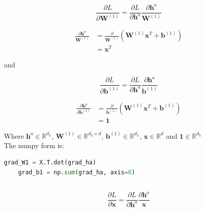 \documentclass[reqno]{amsart}
\theoremstyle{definition}
\theoremstyle{remark}
\numberwithin{equation}{section}
\begin{document}
\subsection{}

\begin{equation}
    \frac{\partial L}{\partial \mathbf{W}^{(1)}} = \frac{\partial L}{\partial \mathbf{h}^a}\frac{\partial \mathbf{h}^a}{ \mathbf{W}^{(1)}}
\end{equation}

\begin{align}
    \frac{\partial \mathbf{h}^a}{ \mathbf{W}^{(1)}} &= \frac{\partial}{\mathbf{W}^{(1)}} (\mathbf{W}^{(1)} \mathbf{x}^T+ \mathbf{b}^{(1)}) \\
    &= \mathbf{x}^T
\end{align}

and 

\begin{equation}
    \frac{\partial L}{\partial \mathbf{b}^{(1)}} = \frac{\partial L}{\partial \mathbf{h}^a}\frac{\partial \mathbf{h}^a}{ \mathbf{b}^{(1)}}
\end{equation}

\begin{align}
    \frac{\partial \mathbf{h}^a}{ \partial \mathbf{b}^{(1)}} &= \frac{\partial}{\mathbf{b}^{(1)}} (\mathbf{W}^{(1)} \mathbf{x}^T+ \mathbf{b}^{(1)}) \\
    &= \mathbf{1}
\end{align}

Where $\mathbf{h}^{a} \in \mathbb{R}^{d_h}$, $\mathbf{W}^{(1)} \in \mathbb{R}^{d_h \times d}$, $\mathbf{b}^{(1)} \in \mathbb{R}^{d_h}$, $\mathbf{x} \in \mathbb{R}^{d}$ and $\mathbf{1} \in \mathbb{R}^{d_h}$\\

The numpy form is:

\begin{lstlisting}[language=Python]
    grad_W1 = X.T.dot(grad_ha) 
    grad_b1 = np.sum(grad_ha, axis=0)
\end{lstlisting}

\subsection{}

\begin{equation}
    \frac{\partial L}{\partial \mathbf{x}} = \frac{\partial L}{\partial \mathbf{h}^a}\frac{\partial \mathbf{h}^a}{ \mathbf{x}}
\end{equation}\\
\end{document}
